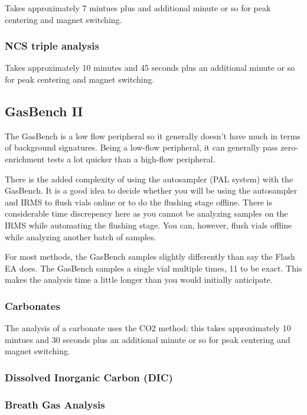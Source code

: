 \documentclass[12pt]{../SOP4_alpha}\usepackage[]{graphicx}\usepackage[]{color}
\begin{document}
\NP Takes approximately 7 mintues plus and additional minute or so for peak centering and magnet switching.

\subsubsection{NCS triple analysis} 

\NP Takes approximately 10 minutes and 45 seconds plus an additional minute or so for peak centering and magnet switching.

\subsection{GasBench II}

\NP The GasBench is a low flow peripheral so it generally doesn't have much in terms of background signatures. Being a low-flow peripheral, it can generally pass zero-enrichment tests a lot quicker than a high-flow peripheral.

\NP There is the added complexity of using the autosampler (PAL system) with the GasBench. It is a good idea to decide whether you will be using the autosampler and IRMS to flush vials online or to do the flushing stage offline. There is considerable time discrepency here as you cannot be analyzing samples on the IRMS while automating the flushing stage. You can, however, flush vials offline while analyzing another batch of samples.

\NP For most methods, the GasBench samples slightly differently than say the Flash EA does. The GasBench samples a single vial multiple times, 11 to be exact. This makes the analysis time a little longer than you would initially anticipate.

\subsubsection{Carbonates}

\NP The analysis of a carbonate uses the CO2 method; this takes approximately 10 mintues and 30 seconds plus an additional minute or so for peak centering and magnet switching.

\subsubsection{Dissolved Inorganic Carbon (DIC)}

\subsubsection{Breath Gas Analysis}
\end{document}
